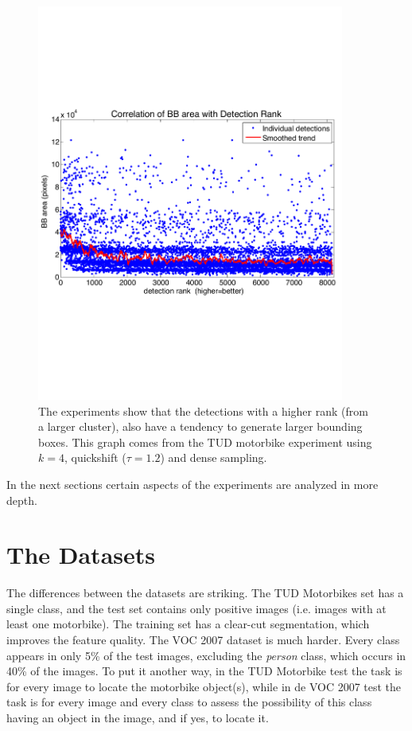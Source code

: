 \begin{figure}[hbt]
    \centering
    \includegraphics[width=0.9\textwidth]{BBSizeVsRank}
    \caption{The experiments show that the detections with a higher rank (from a larger cluster), also have a tendency to generate larger bounding boxes. This graph comes from the TUD motorbike experiment using $k=4$, quickshift ($\tau=1.2$) and dense sampling.}
    \label{fig:bbsizevsrank}
\end{figure}

In the next sections certain aspects of the experiments are analyzed in more depth.

\section{The Datasets} %
\label{sec:the_dataset}

The differences between the datasets are striking. The TUD Motorbikes set has a single class, and the test set contains only positive images (i.e. images with at least one motorbike). The training set has a clear-cut segmentation, which improves the feature quality. The VOC 2007 dataset is much harder. Every class appears in only 5\% of the test images, excluding the \emph{person} class, which occurs in 40\% of the images. To put it another way, in the TUD Motorbike test the task is for every image to locate the motorbike object(s), while in de VOC 2007 test the task is for every image and every class to assess the possibility of this class having an object in the image, and if yes, to locate it.

